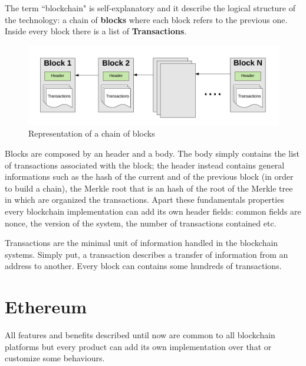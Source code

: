 The term ``blockchain" is self-explanatory and it describe the logical structure of the technology: a chain of 
\textbf{blocks} where each block refers to the previous one. Inside every block there is a list of \textbf{Transactions}.

\begin{figure}[!ht]
    \centering
\includegraphics[width=\textwidth]{images/chain_of_blocks.png}
    \caption{Representation of a chain of blocks \cite{Medium}}
    \label{images:chain_of_blocks}
\end{figure}

Blocks are composed by an header and a body. The body simply contains the list of transactions associated with the block; the 
header instead contains general informations such as the hash of the current and of the previous block (in order to build a 
chain), the Merkle root that is an hash of the root of the Merkle tree in which are organized the transactions.
Apart these fundamentals properties every blockchain implementation can add its own header fields: common fields are nonce, 
the version of the system, the number of transactions contained etc.

Transactions are the minimal unit of information handled in the blockchain systems. Simply put, a transaction describes a 
transfer of information from an address to another. Every block can contains some hundreds of transactions.


\section{Ethereum}
\label{blockchain:ethereum}
All features and benefits described until now are common to all blockchain platforms but every product can 
add its own implementation over that or customize some behaviours.

